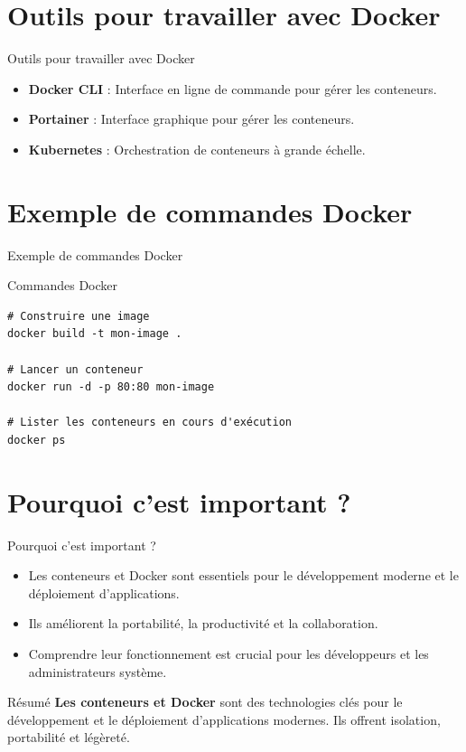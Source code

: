 \documentclass{clbeamer2024}
\begin{document}
\section{Outils pour travailler avec Docker}
\begin{frame}{Outils pour travailler avec Docker}
	\begin{itemize}
		\item \textbf{Docker CLI} : Interface en ligne de commande pour gérer les conteneurs.
		\item \textbf{Portainer} : Interface graphique pour gérer les conteneurs.
		\item \textbf{Kubernetes} : Orchestration de conteneurs à grande échelle.
	\end{itemize}
\end{frame}

\section{Exemple de commandes Docker}
\begin{frame}[fragile]{Exemple de commandes Docker}
	\begin{exampleblock}{Commandes Docker}
		\begin{verbatim}
# Construire une image
docker build -t mon-image .
			
# Lancer un conteneur
docker run -d -p 80:80 mon-image
			
# Lister les conteneurs en cours d'exécution
docker ps
		\end{verbatim}
	\end{exampleblock}
\end{frame}

\section{Pourquoi c'est important ?}
\begin{frame}{Pourquoi c'est important ?}
	\begin{itemize}
		\item Les conteneurs et Docker sont essentiels pour le développement moderne et le déploiement d'applications.
		\item Ils améliorent la portabilité, la productivité et la collaboration.
		\item Comprendre leur fonctionnement est crucial pour les développeurs et les administrateurs système.
	\end{itemize}
\end{frame}

\begin{frame}{Résumé}
	\textbf{Les conteneurs et Docker} sont des technologies clés pour le développement et le déploiement d'applications modernes. Ils offrent isolation, portabilité et légèreté. 🐳
\end{frame}


	
	
\end{document}
